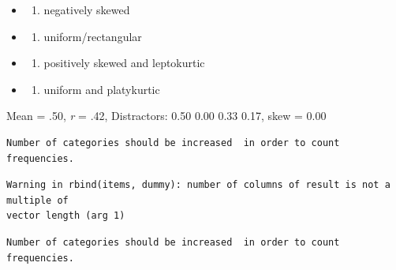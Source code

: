 \documentclass[
  english,
]{book}
\newenvironment{Shaded}{\begin{snugshade}}{\end{snugshade}}
\newcommand{\AttributeTok}[1]{\textcolor[rgb]{0.77,0.63,0.00}{#1}}
\newcommand{\DecValTok}[1]{\textcolor[rgb]{0.00,0.00,0.81}{#1}}
\newcommand{\FunctionTok}[1]{\textcolor[rgb]{0.00,0.00,0.00}{#1}}
\newcommand{\NormalTok}[1]{#1}
\newcommand{\SpecialCharTok}[1]{\textcolor[rgb]{0.00,0.00,0.00}{#1}}
\providecommand{\tightlist}{%
  \setlength{\itemsep}{0pt}\setlength{\parskip}{0pt}}
\begin{document}
\begin{itemize}
\item
  \begin{enumerate}
  \def\labelenumi{\alph{enumi})}
  \tightlist
  \item
    negatively skewed
  \end{enumerate}
\item
  \begin{enumerate}
  \def\labelenumi{\alph{enumi})}
  \setcounter{enumi}{1}
  \tightlist
  \item
    uniform/rectangular
  \end{enumerate}
\item
  \begin{enumerate}
  \def\labelenumi{\alph{enumi})}
  \setcounter{enumi}{2}
  \tightlist
  \item
    positively skewed and leptokurtic
  \end{enumerate}
\item
  \begin{enumerate}
  \def\labelenumi{\alph{enumi})}
  \setcounter{enumi}{3}
  \tightlist
  \item
    uniform and platykurtic
  \end{enumerate}
\end{itemize}

Mean = .50, \emph{r} = .42, Distractors: 0.50 0.00 0.33 0.17, skew = 0.00

\begin{Shaded}
\end{Shaded}

\begin{verbatim}
Number of categories should be increased  in order to count frequencies. 
\end{verbatim}

\begin{verbatim}
Warning in rbind(items, dummy): number of columns of result is not a multiple of
vector length (arg 1)
\end{verbatim}

\begin{verbatim}
Number of categories should be increased  in order to count frequencies. 
\end{verbatim}
\end{document}

